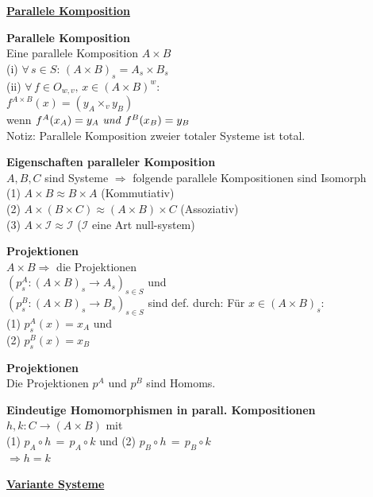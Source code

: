 \begin{multicols}{2}

\textbf{\underline{Parallele Komposition}} 

\textbf{ Parallele Komposition} \\
Eine parallele Komposition $A\times B$  \\
(i) $\forall \, s \in S:\,\left(A\times B\right)_{s}=A_{s}\times B_{s}$ \\
(ii) $\forall \, f\in O_{w,v},\, x\in\left(A\times B\right)^{w}:$\\$f^{A\times B}(x)=(y_{A}\times_{v}y_{B})$\\ wenn $f^{A}(x_{A})=y_{A}\textrm{ \emph{und} }f^{B}(x_{B})=y_{B}$\\
Notiz: Parallele Komposition zweier totaler Systeme ist total.

\textbf{ Eigenschaften paralleler Komposition} \\
$A,B,C$ sind Systeme $\Rightarrow$ folgende parallele Kompositionen sind Isomorph \\
(1) $A \times B \approx B \times A$ (Kommutiativ)\\
(2) $A \times (B \times C) \approx (A \times B) \times C$ (Assoziativ) \\
(3) $A \times \mathcal{I} \approx \mathcal{I}$ ($\mathcal{I}$ eine Art null-system)


\textbf{ Projektionen} \\
$A \times B \Rightarrow$  die Projektionen \\ 
$\left(p_{s}^{A}:\left(A\times B\right)_{s}\rightarrow A_{s}\right)_{s\in S}$
und \\ $\left(p_{s}^{B}:\left(A\times B\right)_{s}\rightarrow B_{s}\right)_{s\in S}$
sind def. durch: Für $x\in\left(A\times B\right)_{s}$: \\(1)
$p_{s}^{A}(x)=x_{A}$ und \\(2) $p_{s}^{B}(x)=x_{B}$

\textbf{ Projektionen} \\
Die Projektionen $p^A$ und $p^B$ sind Homoms.

\textbf{ Eindeutige Homomorphismen in parall. Kompositionen} \\
$h,k: C \rightarrow (A \times B)$ \homos mit \\
(1) $p_A \circ h \, = \, p_A \circ k$ und 
(2) $p_B \circ h \, = \, p_B \circ k$\\$ \Rightarrow h = k$

\columnbreak
\textbf{\underline{Variante Systeme}} 



\end{multicols}
